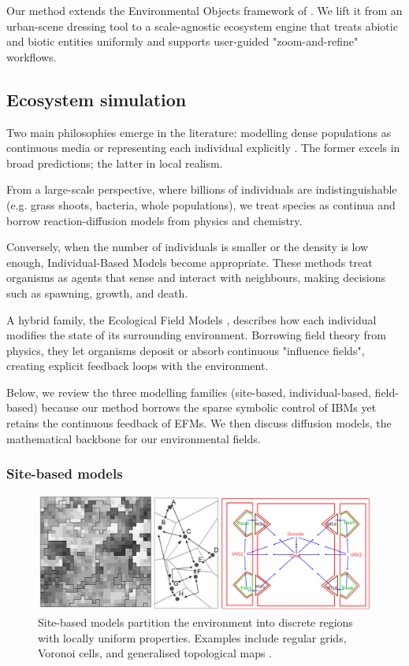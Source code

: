 Our method extends the Environmental Objects framework of \citep{Grosbellet2016}. We lift it from an urban-scene dressing tool to a scale-agnostic ecosystem engine that treats abiotic and biotic entities uniformly and supports user-guided "zoom-and-refine" workflows.

\subsection{Ecosystem simulation}

Two main philosophies emerge in the literature: modelling dense populations as continuous media \cite{Turing1952} or representing each individual explicitly \cite{Czaran1998}. The former excels in broad predictions; the latter in local realism.

From a large-scale perspective, where billions of individuals are indistinguishable (e.g. grass shoots, bacteria, whole populations), we treat species as continua and borrow reaction-diffusion models from physics and chemistry.

Conversely, when the number of individuals is smaller or the density is low enough, Individual-Based Models become appropriate. These methods treat organisms as agents that sense and interact with neighbours, making decisions such as spawning, growth, and death.

A hybrid family, the Ecological Field Models \cite{Wu1985}, describes how each individual modifies the state of its surrounding environment. Borrowing field theory from physics, they let organisms deposit or absorb continuous "influence fields", creating explicit feedback loops with the environment.

Below, we review the three modelling families (site-based, individual-based, field-based) because our method borrows the sparse symbolic control of IBMs yet retains the continuous feedback of EFMs. We then discuss diffusion models, the mathematical backbone for our environmental fields.

\subsubsection{Site-based models}

\begin{figure}[H]
    \centering
    \includegraphics[width=.8\linewidth]{grid-based-modeling-teaser.png}
    \caption{Site-based models partition the environment into discrete regions with locally uniform properties. Examples include regular grids, Voronoi cells, and generalised topological maps \cite{Nelson2012,Lemiere2023}.}
    \label{fig:env-obj_grid-based-models}
\end{figure}

